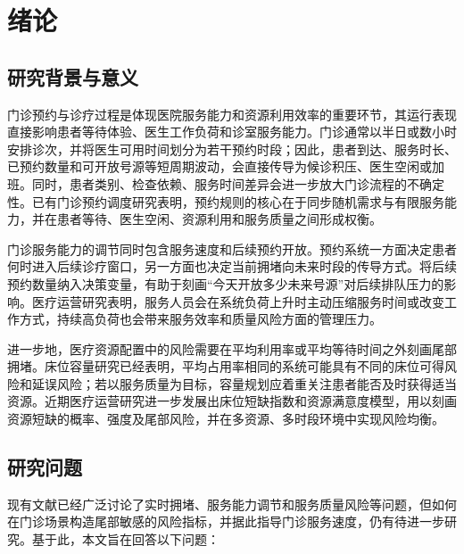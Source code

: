 \documentclass[a4paper,zihao=-4]{ctexart}
\numberwithin{figure}{section}
\numberwithin{table}{section}
\begin{document}
\clearpage
{}
\setcounter{page}{1}

\section{绪论}

\subsection{研究背景与意义}

门诊预约与诊疗过程是体现医院服务能力和资源利用效率的重要环节，其运行表现直接影响患者等待体验、医生工作负荷和诊室服务能力。门诊通常以半日或数小时安排诊次，并将医生可用时间划分为若干预约时段；因此，患者到达、服务时长、已预约数量和可开放号源等短周期波动，会直接传导为候诊积压、医生空闲或加班\citep{FetterThompson1966,KuiperDeMastMandjes2021,LaanVanDeVrugtOlsmanBoucherie2018}。同时，患者类别、检查依赖、服务时间差异会进一步放大门诊流程的不确定性\citep{SalzaruloBretthauerCoteSchultz2011,ChandMoskowitzNorrisShadeWillis2009}。已有门诊预约调度研究表明，预约规则的核心在于同步随机需求与有限服务能力，并在患者等待、医生空闲、资源利用和服务质量之间形成权衡\citep{Bailey1952,CayirliVeral2003,GuptaDenton2008,AhmadiJavid2017}。

门诊服务能力的调节同时包含服务速度和后续预约开放。预约系统一方面决定患者何时进入后续诊疗窗口，另一方面也决定当前拥堵向未来时段的传导方式。将后续预约数量纳入决策变量，有助于刻画“今天开放多少未来号源”对后续排队压力的影响。医疗运营研究表明，服务人员会在系统负荷上升时主动压缩服务时间或改变工作方式，持续高负荷也会带来服务效率和质量风险方面的管理压力\citep{KcTerwiesch2009,BerryJaekerTucker2017}。

进一步地，医疗资源配置中的风险需要在平均利用率或平均等待时间之外刻画尾部拥堵。床位容量研究已经表明，平均占用率相同的系统可能具有不同的床位可得风险和延误风险；若以服务质量为目标，容量规划应着重关注患者能否及时获得适当资源\citep{Green2002,BagustPlacePosnett1999}。近期医疗运营研究进一步发展出床位短缺指数和资源满意度模型，用以刻画资源短缺的概率、强度及尾部风险，并在多资源、多时段环境中实现风险均衡\citep{XieLokeSimLam2023,ZhouSimLam2022}。

\subsection{研究问题}

现有文献已经广泛讨论了实时拥堵、服务能力调节和服务质量风险等问题，但如何在门诊场景构造尾部敏感的风险指标，并据此指导门诊服务速度，仍有待进一步研究。基于此，本文旨在回答以下问题：
\end{document}
